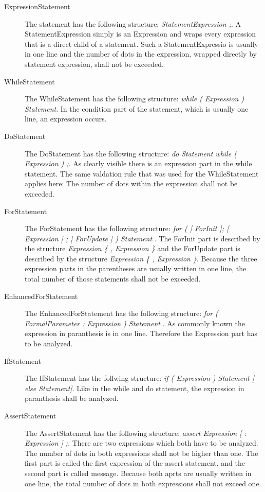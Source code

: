 \begin{description}
  \item[ExpressionStatement] The statement has the following structure: \textit{ StatementExpression ;}. A StatementExpression simply is an Expression and wraps every expression that is a direct child of a statement. Such a StatementExpressio is usually in one line and the number of dots in the expression, wrapped directly by statement expression, shall not be exceeded.
  \item[WhileStatement] The WhileStatement  has the following structure: \textit{while ( Expression ) Statement}. In the condition part of the statement, which is usually one line, an expression occurs.
  \item[DoStatement] The DoStatement has the following structure: \textit{do Statement while ( Expression ) ;}. As clearly visible there is an expression part in the while statement. The same valdation rule that was used for the WhileStatement applies here: The number of dots within the expression shall not be exceeded.
  \item[ForStatement] The ForStatement has the following structure: \textit{for ( [ ForInit ]; [ Expression ] ; [ ForUpdate ] ) Statement  
  }. The ForInit part is described by the structure \textit{Expression \{ , Expression \}} and the ForUpdate  part is described by the structure \textit{ Expression \{ , Expression \}}. Because the three expression parts in the parentheses are usually written in one line, the total number of those statements shall not be exceeded.
  \item[EnhancedForStatement] The EnhancedForStatement has the following structure: \textit{for ( FormalParameter : Expression ) Statement }. As commonly known the expression in paranthesis is in one line. Therefore the Expression part has to be analyzed.
  \item[IfStatement] The IfStatement has the follwing structure: \textit{if ( Expression ) Statement [ else Statement]}. Like in the while and do statement, the expression in paranthesis shall be analyzed. 
  \item[AssertStatement] The AssertStatement  has the following structure: \textit{assert Expression [ : Expression ] ;}. There are two expressions which both have to be analyzed. The number of dots in both expressions shall not be higher than one. The first part is called the first expression of the assert statement, and the second part is called message. Because both aprts are usually written in one line, the total number of dots in both expressions shall not exceed one.

\end{description}
